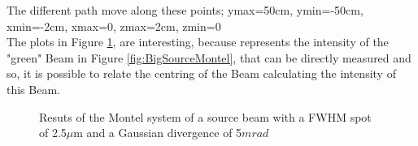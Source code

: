 The different path move along these points; ymax=50cm, ymin=-50cm, xmin=-2cm, xmax=0, zmax=2cm, zmin=0
\\
The plots in Figure \ref{fig: 2nd reuslt diff. path}, are interesting, because represents the intensity of the "green" Beam in Figure \ref{fig:BigSourceMontel}, that can be directly measured and so, it is possible to relate the centring of the Beam calculating the intensity of this Beam.
%
\begin{figure}[]
%
\centering
%
%
\quad
%
%
\caption{Resuts of the Montel system of a source beam with a FWHM spot of 2.5$\mu $m and a Gaussian divergence of 5$mrad $}
%
\label{fig: 2nd reuslt diff. path}
%
\end{figure}
